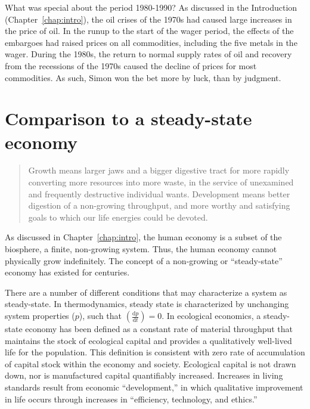 What was special about the period 1980-1990?
As discussed in the Introduction (Chapter~\ref{chap:intro}),
the oil crises of the 1970s had caused large increases in the price of oil.
In the runup to the start of the wager period, 
the effects of the embargoes had raised prices
on all commodities, including the five metals in the wager.
During the 1980s, the return to normal supply rates of oil
and recovery from the recessions of the 1970s
caused the decline of prices for most commodities.
As such, Simon won the bet more by luck, than by judgment.


\section{Comparison to a steady-state economy}
\label{sec:SSE}

\begin{quotation}
	Growth means larger jaws and a bigger digestive tract 
	for more rapidly converting more resources into more waste, 
	in the service of unexamined and frequently destructive 
	individual wants.
	Development means better digestion of a non-growing throughput, 
	and more worthy and satisfying goals to which our life energies 
	could be devoted.\cite{Daly:2012aa}
\end{quotation}


As discussed in Chapter~\ref{chap:intro},
the human economy is a subset of the biosphere, 
a finite, non-growing system.
Thus, the human economy cannot physically grow indefinitely.
The concept of a non-growing or ``steady-state'' economy
has existed for centuries.

There are a number of different
conditions that may characterize a system as steady-state.
In thermodynamics,
steady state is characterized by unchanging system properties ($p$),
such that $\left(\frac{\textrm{d}p}{\textrm{d}t}\right) = 0$.
In ecological economics, a steady-state
economy has been defined as a constant rate
of material throughput that maintains the stock
of ecological capital and provides a qualitatively well-lived life 
for the population.\cite[p.~32]{Daly1997}  
This definition is consistent
with zero rate of accumulation of capital stock within the economy and society. 
Ecological capital is not drawn down, 
nor is manufactured capital quantifiably increased. 
Increases in living standards result from economic ``development,'' 
in which qualitative 
improvement in life occurs through increases 
in ``efficiency, technology, and ethics.''~\cite[p.~167]{Daly1997} 

